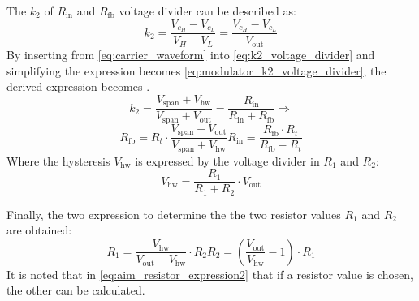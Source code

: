 The $k_{2}$ of $R_{\mathrm{in}}$ and $R_{\mathrm{fb}}$ voltage divider can be described as:
\begin{equation} \label{eq:k2_voltage_divider}
	k_{2} = \frac{V_{c_{H}} - V_{c_{L}}}{V_{H} - V_{L}} = \frac{V_{c_{H}} - V_{c_{L}}}{V_{\mathrm{out}}}
\end{equation}
By inserting from \autoref{eq:carrier_waveform} into \autoref{eq:k2_voltage_divider} and simplifying the expression becomes \autoref{eq:modulator_k2_voltage_divider}, the derived expression becomes .
\begin{equation} \label{eq:modulator_k2_voltage_divider}
	k_{2} = \frac{V_{\mathrm{span}} + V_{\mathrm{hw}}}{V_{\mathrm{span}} + V_{\mathrm{out}}} = \frac{R_{\mathrm{in}}}{R_{\mathrm{in}} + R_{\mathrm{fb}}} \Longrightarrow 
\end{equation}
\begin{subequations} \label{eq:modulator_rfb_rin}
	\begin{equation} \label{eq:modulator_rfb_rin_a}
		R_{\mathrm{fb}} = R_{t} \cdot \frac{V_{\mathrm{span}} + V_{\mathrm{out}}}{V_{\mathrm{span}} + V_{\mathrm{hw}}}
	\end{equation}
	\begin{equation} \label{eq:modulator_rfb_rin_b}
		R_{\mathrm{in}} = \frac{R_{\mathrm{fb}} \cdot R_{t}}{R_{\mathrm{fb}} - R_{t}}
	\end{equation}
\end{subequations}
Where the hysteresis $V_{\mathrm{hw}}$ is expressed by the voltage divider in $R_{1}$ and $R_{2}$:
\begin{equation}
	V_{\mathrm{hw}} = \frac{R_{1}}{R_{1} + R_{2}} \cdot V_{\mathrm{out}}
\end{equation}

Finally, the two expression to determine the the two resistor values $R_{1}$ and $R_{2}$ are obtained:
\begin{subequations} \label{eq:aim_resistor_expression2}
	\begin{equation} \label{eq:aim_resistor_expression2_a}
		R_{1} = \frac{V_{\mathrm{hw}}}{V_{\mathrm{out}} - V_{\mathrm{hw}}} \cdot R_{2}
	\end{equation}
	\begin{equation} \label{eq:aim_resistor_expression2_b}
		R_{2} = \left( \frac{V_{\mathrm{out}}}{V_{\mathrm{hw}}} -1 \right) \cdot R_{1}
	\end{equation}
\end{subequations}
It is noted that in \autoref{eq:aim_resistor_expression2} that if a resistor value is chosen, the other can be calculated.


